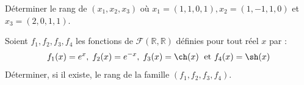 \documentclass[a4paper,10pt]{report}
\begin{document}
\begin{exa} Déterminer le rang de $(x_{1} ,x_{2} ,x_{3})$ où $x_{1} = (1,1,0,1),x_{2} = (1, - 1,1,0)$ et $x_{3} = (2,0,1,1)$. \end{exa}

\begin{exa} Soient $f_1,f_2,f_3,f_4$ les fonctions de $\mathcal{F}(\mathbb{R}, \mathbb{R})$ définies pour tout réel $x$ par :
$$  f_1(x)=e^x, \; f_2(x)=e^{-x}, \; f_3(x) = \ch(x) \; \hbox{ et } f_4(x)=\sh(x)$$
Déterminer, si il existe, le rang de la famille $(f_1,f_2,f_3,f_4)$.
\end{exa}


%
%
%
%
%
%
%
%
%
%
%


 
 
 
 
 
 
\end{document}
